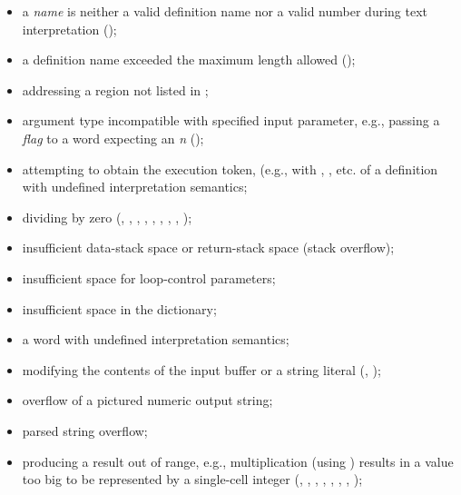 \begin{itemize}

\item a \emph{name} is neither a valid definition name nor a valid
	number during text interpretation ();

\item a definition name exceeded the maximum length allowed
	();

\item addressing a region not listed in ;

\item argument type incompatible with specified input parameter,
	e.g., passing a \emph{flag} to a word expecting an \emph{n}
	();

\item attempting to obtain the execution token, (e.g., with
	, , etc. of a definition
	with undefined interpretation semantics;

\item dividing by zero
	(,
	 ,
	 ,
	 ,
	 ,
	 ,
	 ,
	 ,
	 );

\item insufficient data-stack space or return-stack space (stack
	overflow);

\item insufficient space for loop-control parameters;

\item insufficient space in the dictionary;

\item {} a word with undefined interpretation semantics;

\item modifying the contents of the input buffer or a string literal
	(,
	);

\item overflow of a pictured numeric output string;

\item parsed string overflow;

\item producing a result out of range, e.g., multiplication
	(using \word{*}) results in a value too big to be represented by
	a single-cell integer
	(,
	 ,
	 ,
	 ,
	 ,
	 ,
	 ,
	 );


\end{itemize}
